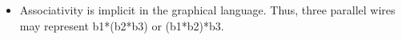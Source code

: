 \documentclass{llncs}
\begin{document}
\begin{itemize}
\begin{multicols}{4}


\end{multicols}




\item Associativity is implicit in the graphical language. Thus, three parallel
  wires may represent {{b1*(b2*b3)}} or {{(b1*b2)*b3}}.


\end{itemize}
\end{document}
